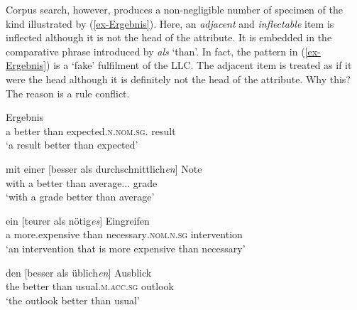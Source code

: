 \documentclass[output=paper
  ,nobabel
  ,uniformtopskip %
]{langscibook}
\begin{document}
Corpus search, however, produces a non-negligible number of specimen of the kind illustrated by (\ref{ex-Ergebnis}). Here, an \emph{adjacent} and \emph{inflectable} item is inflected although it is not the head of the attribute. It is embedded in the comparative phrase introduced by \emph{als} `than'. In fact, the pattern in (\ref{ex-Ergebnis}) is a `fake' fulfilment of the LLC. The adjacent item is treated as if it were the head although it is definitely not the head of the attribute. Why this? The reason is a rule conflict.

\eal\label{ex-Ergebnis}
\ex\label{ex-besser}
 Ergebnis\footnotemark\\
\spacebr{}a better than expected\textsc{.n.nom.sg.} result \\
\glt `a result better than expected'

\ex

\gll mit einer [besser als durchschnittlich\emph{en}] Note\footnotemark\\
     with a    \spacebr{}better than average.\fem{}.\NOM{}.\SG{} grade\\
\glt `with a grade better than average'

\ex
\gll ein [teurer als nötig\emph{es}] Eingreifen\footnotemark\\
a \spacebr{}more.expensive than necessary\textsc{.nom.n.sg} intervention \\
\glt `an intervention that is more expensive than necessary'
 
\ex
\gll den [besser als üblich\emph{en}] Ausblick\footnotemark\\
the \spacebr{}better than usual\textsc{.m.acc.sg} outlook \\
\glt `the outlook better than usual'
\zl
\end{document}
